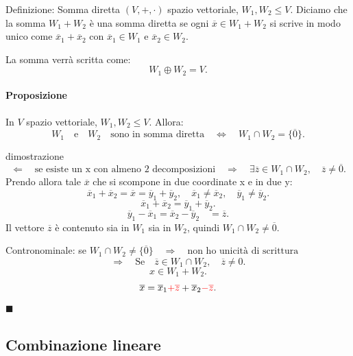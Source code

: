 \documentclass[x11names]{article}
\newcommand*{\QEDA}{\null\nobreak\hfill\ensuremath{\blacksquare}}%
\begin{document}
\begin{center}
\colorbox{myblue}{\begin{minipage}{5.75in}
\begin{blues}{Definizione: Somma diretta}
$\left(V,+,\cdot\right)$ spazio vettoriale, $W_1,W_2 \leq V$. Diciamo che la somma $W_1+W_2$ è una somma diretta se ogni $\overline{x} \in W_1+W_2$ si scrive in modo unico come $\overline{x}_1 + \overline{x}_2$ con $\overline{x}_1 \in W_1$ e $\overline{x}_2 \in W_2 $.

La somma verrà scritta come:
\[
W_1 \oplus W_2 = V
.\] 
\end{blues}
\end{minipage}}        
\end{center}

\paragraph{Proposizione}
In $V$ spazio vettoriale, $W_1,W_2 \leq V$. Allora:
\[
W_1 \quad \text{e} \quad W_2 \quad \text{sono in somma diretta} \quad \Longleftrightarrow \quad W_1 \cap W_2 = \{\overline{0}\} 
.\] 

\begin{es}{dimostrazione}
\[
\Leftarrow \quad \text{se esiste un x con almeno 2 decomposizioni} \quad \Rightarrow \quad \exists \overline{z} \in W_1 \cap W_2,\quad \overline{z} \neq \overline{0}
.\] 
Prendo allora tale $\overline{x}$ che si scompone in due coordinate x e in due y:
\[
\overline{x}_{1} + \overline{x}_{2} = \overline{x} = \overline{y}_{1} + \overline{y}_{2}, \quad \overline{x}_{1} \neq \overline{x}_{2}, \quad \overline{y}_{1} \neq \overline{y}_{2}
.\] 
\[
\overline{x}_{1} + \overline{x}_{2} = \overline{y}_{1} + \overline{y}_{2}
.\] 
\[
\overline{y}_{1} - \overline{x}_{1} = \overline{x}_{2} - \overline{y}_{2} \quad = \overline{z}
.\] 
Il vettore $\overline{z}$ è contenuto sia in $W_1$ sia in $W_2$, quindi $W_1 \cap W_2 \neq \overline{0}$.

Contronominale: se $W_1 \cap W_2 \neq \{\overline{0}\} \quad \Rightarrow \quad \text{non ho unicità di scrittura}$
\[
\Rightarrow \quad \text{Se} \quad \overline{z} \in W_1 \cap W_2, \quad\overline{z} \neq 0
.\] 
\[
x \in W_1 + W_2
.\] 
\[
\overline{x} = \overline{x}_{1} \textcolor{red}{+\overline{z}} + \overline{x}_{2} \textcolor{red}{-\overline{z}}
.\] 
\QEDA
\end{es}

\subsection{Combinazione lineare}
\end{document}

